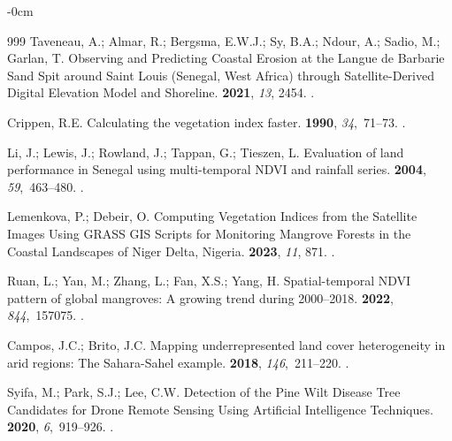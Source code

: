 \documentclass[earth,article,accept,pdftex,moreauthors]{Definitions/mdpi}
\begin{document}
{\begin{adjustwidth}{-\extralength}{0cm}
\begin{thebibliography}{999}
Taveneau, A.; Almar, R.; Bergsma, E.W.J.; Sy, B.A.; Ndour, A.; Sadio, M.;
  Garlan, T.
\newblock Observing and Predicting Coastal Erosion at the Langue de Barbarie
  Sand Spit around Saint Louis (Senegal, West Africa) through Satellite-Derived
  Digital Elevation Model and Shoreline.
 {\bf 2021}, {\em 13}, 2454.
.

Crippen, R.E.
\newblock Calculating the vegetation index faster.
 {\bf 1990}, {\em 34},~71--73.
.

Li, J.; Lewis, J.; Rowland, J.; Tappan, G.; Tieszen, L.
\newblock Evaluation of land performance in Senegal using multi-temporal NDVI
  and rainfall series.
 {\bf 2004}, {\em 59},~463--480.
.

Lemenkova, P.; Debeir, O.
\newblock Computing Vegetation Indices from the Satellite Images Using GRASS
  GIS Scripts for Monitoring Mangrove Forests in the Coastal Landscapes of
  Niger Delta, Nigeria.
 {\bf 2023}, {\em 11}, 871.
.

Ruan, L.; Yan, M.; Zhang, L.; Fan, X.S.; Yang, H.
\newblock Spatial-temporal NDVI pattern of global mangroves: A growing trend
  during 2000–2018.
 {\bf 2022}, {\em 844},~157075.
.

Campos, J.C.; Brito, J.C.
\newblock Mapping underrepresented land cover heterogeneity in arid regions:
  The Sahara-Sahel example.
 {\bf 2018},
  {\em 146},~211--220.
.

Syifa, M.; Park, S.J.; Lee, C.W.
\newblock Detection of the Pine Wilt Disease Tree Candidates for Drone Remote
  Sensing Using Artificial Intelligence Techniques.
 {\bf 2020}, {\em 6},~919--926.
.


\end{thebibliography}
\end{adjustwidth}}
\end{document}
